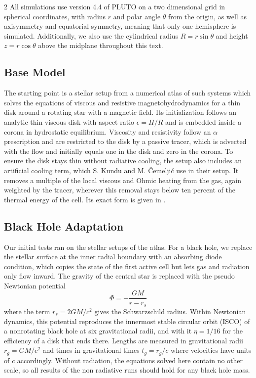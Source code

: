 \begin{multicols}{2}
	All simulations use version 4.4 of PLUTO \cite{mign2007} on a two dimensional grid in spherical coordinates, with radius $r$ and
	polar angle $\theta$ from the origin, as well as axisymmetry and equatorial symmetry, meaning that only one hemisphere is simulated.
	Additionally, we also use the cylindrical radius $R = r \sin\theta$ and height $z = r \cos\theta$ above the midplane throughout this text.

	\subsection{Base Model}

	The starting point is a stellar setup from a numerical atlas of such systems \cite{ceme2019} which solves the equations of viscous
	and resistive magnetohydrodynamics for a thin disk around a rotating star with a magnetic field. Its initialization follows an
	analytic thin viscous disk \cite{kluz2000} with aspect ratio $\epsilon = H/R$ and is embedded inside a corona in
	hydrostatic equilibrium. Viscosity and resistivity follow an $\alpha$ prescription and are restricted to the disk by a passive
	tracer, which is advected with the flow and initially equals one in the disk and zero in the corona. To ensure the disk stays thin
	without radiative cooling, the setup also includes an artificial cooling term, which S. Kundu and M. Čemeljić use in their setup.
	It removes a multiple of the local viscous and Ohmic heating from the gas, again weighted by the tracer, wherever this
	removal stays below ten percent of the thermal energy of the cell. Its exact form is given in .

	\subsection{Black Hole Adaptation}

	Our initial tests ran on the stellar setups of the atlas. For a black hole, we replace the stellar surface at the inner radial
	boundary with an absorbing diode condition, which copies the state of the first active cell but lets gas and radiation only
	flow inward. The gravity of the central star is replaced with the pseudo Newtonian potential \cite{pacz1980}
	\begin{equation}
		\Phi = -\frac{G M}{r - r_s}
	\end{equation}
	where the term $r_s = 2 G M / c^2$ gives the Schwarzschild radius. Within Newtonian dynamics, this potential reproduces the
	innermost stable circular orbit (ISCO) of a nonrotating black hole at six gravitational radii, and with it $\eta = 1/16$ for the
	efficiency of a disk that ends there. Lengths are measured in gravitational radii $r_g = G M / c^2$ and times in gravitational
	times $t_g = r_g / c$ where velocities have units of $c$ accordingly. Without radiation, the equations solved here contain no
	other scale, so all results of the non radiative runs should hold for any black hole mass.


\end{multicols}
